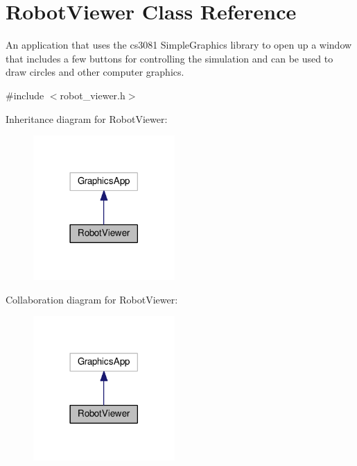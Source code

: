 \hypertarget{classRobotViewer}{}\section{Robot\+Viewer Class Reference}
\label{classRobotViewer}


An application that uses the cs3081 Simple\+Graphics library to open up a window that includes a few buttons for controlling the simulation and can be used to draw circles and other computer graphics.  




{\ttfamily \#include $<$robot\+\_\+viewer.\+h$>$}



Inheritance diagram for Robot\+Viewer\+:
\nopagebreak
\begin{figure}[H]
\begin{center}
\leavevmode
\includegraphics[width=153pt]{classRobotViewer__inherit__graph}
\end{center}
\end{figure}


Collaboration diagram for Robot\+Viewer\+:
\nopagebreak
\begin{figure}[H]
\begin{center}
\leavevmode
\includegraphics[width=153pt]{classRobotViewer__coll__graph}
\end{center}
\end{figure}
